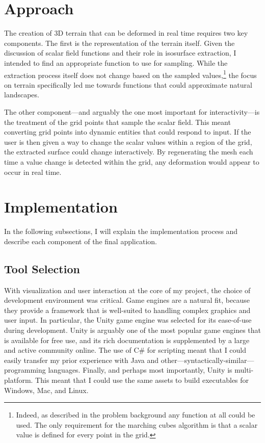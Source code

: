 \documentclass[pageno]{jpaper}
\begin{document}
\section{Approach}

The creation of 3D terrain that can be deformed in real time requires two key components. The first is the representation of the terrain itself. Given the discussion of scalar field functions and their role in isosurface extraction, I intended to find an appropriate function to use for sampling. While the extraction process itself does not change based on the sampled values,\footnote{Indeed, as described in the problem background any function at all could be used. The only requirement for the marching cubes algorithm is that a scalar value is defined for every point in the grid.} the focus on terrain specifically led me towards functions that could approximate natural landscapes.

The other component—and arguably the one most important for interactivity—is the treatment of the grid points that sample the scalar field. This meant converting grid points into dynamic entities that could respond to input. If the user is then given a way to change the scalar values within a region of the grid, the extracted surface could change interactively. By regenerating the mesh each time a value change is detected within the grid, any deformation would appear to occur in real time.

\section{Implementation}

In the following subsections, I will explain the implementation process and describe each component of the final application.

\subsection{Tool Selection}

With visualization and user interaction at the core of my project, the choice of development environment was critical. Game engines are a natural fit, because they provide a framework that is well-suited to handling complex graphics and user input. In particular, the Unity game engine was selected for its ease-of-use during development. Unity is arguably one of the most popular game engines that is available for free use, and its rich documentation is supplemented by a large and active community online. The use of C\# for scripting meant that I could easily transfer my prior experience with Java and other—syntactically-similar—programming languages. Finally, and perhaps most importantly, Unity is multi-platform. This meant that I could use the same assets to build executables for Windows, Mac, and Linux.
\end{document}
